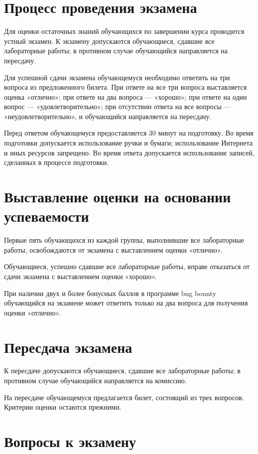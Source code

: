 \documentclass[12pt,a4paper]{article}
\begin{document}
    \makelabcover
    \section{Процесс проведения экзамена}
    Для оценки остаточных знаний обучающихся по завершении курса проводится устный экзамен.
    К экзамену допускаются обучающиеся, сдавшие все лабораторные работы; в противном случае обучающийся направляется на пересдачу.

    Для успешной сдачи экзамена обучающемуся необходимо ответить на три вопроса из предложенного билета.
    При ответе на все три вопроса выставляется оценка «отлично»; при ответе на два вопроса — «хорошо»; при ответе на один вопрос — «удовлетворительно»; при отсутствии ответа на все вопросы — «неудовлетворительно», и обучающийся направляется на пересдачу.

    Перед ответом обучающемуся предоставляется 30 минут на подготовку.
    Во время подготовки допускается использование ручки и бумаги; использование Интернета и иных ресурсов запрещено.
    Во время ответа допускается использование записей, сделанных в процессе подготовки.

    \section{Выставление оценки на основании успеваемости}
    Первые пять обучающихся из каждой группы, выполнившие все лабораторные работы, освобождаются от экзамена с выставлением оценки «отлично».

    Обучающиеся, успешно сдавшие все лабораторные работы, вправе отказаться от сдачи экзамена с выставлением оценки «хорошо».

    При наличии двух и более бонусных баллов в программе bug bounty обучающийся на экзамене может ответить только на два вопроса для получения оценки «отлично».

    \section{Пересдача экзамена}
    К пересдаче допускаются обучающиеся, сдавшие все лабораторные работы; в противном случае обучающийся направляется на комиссию.

    На пересдаче обучающемуся предлагается билет, состоящий из трех вопросов.
    Критерии оценки остаются прежними.

    \section{Вопросы к экзамену}
\end{document}
